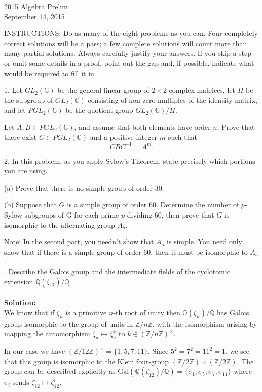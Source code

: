 \documentclass[11pt]{article}
\newcommand{\Z}{\mathbb{Z}}
\newcommand{\Q}{\mathbb{Q}}
\newcommand{\C}{\mathbb{C}}
\begin{document}
\begin{center}
\Large 2015 Algebra Prelim\\
\normalsize September 14, 2015
\end{center}
\vspace{1em}

INSTRUCTIONS: Do as many of the eight problems as you can. Four completely
correct solutions will be a pass; a few complete solutions will count more than many
partial solutions. Always carefully justify your answers. If you skip a step or omit
some details in a proof, point out the gap and, if possible, indicate what would be
required to fill it in\\
\vspace{1em}

1. Let $GL_2(\C)$ be the general linear group of $2\times 2$ complex matrices, let $H$ be the subgroup
of $GL_2(\C)$ consisting of non-zero multiples of the identity matrix, and let $PGL_2(\C)$ be
the quotient group $GL_2(\C)/ H$.

Let $A, B\in PGL_2(\C)$, and assume that both elements have order $n$. Prove that there
exist $C\in PGL_2(\C)$ and a positive integer $m$ such that\[
CBC^{-1} = A^m.\]

2. In this problem, as you apply Sylow’s Theorem, state precisely which portions you are
using.

(a) Prove that there is no simple group of order 30.

(b) Suppose that $G$ is a simple group of order $60$. Determine the number of $p$-Sylow
subgroups of G for each prime $p$ dividing 60, then prove that $G$ is isomorphic to
the alternating group $A_5$.

Note: In the second part, you needn’t show that $A_5$ is simple. You need only show
that if there is a simple group of order 60, then it must be isomorphic to $A_5$.\\
. Describe the Galois group and the intermediate fields of the cyclotomic extension
$\Q(\zeta_{12})/\Q$.\\\\
\textbf{Solution:}\\
We know that if $\zeta_n$ is a primitive $n$-th root of unity then $\Q(\zeta_n)/\Q$ has Galois group isomorphic to the group of units in $\Z/n\Z$, with the isomorphism arising by mapping the automorphism $\zeta_n\mapsto \zeta_n^k$ to $k\in (\Z/n\Z)^\times$. 

In our case we have $(\Z/12\Z)^\times = \{1,5,7,11\}$. Since $5^2 = 7^2 = 11^2 = 1$, we see that this group is isomorphic to the Klein four-group $(\Z/2\Z)\times (\Z/2\Z)$. The group can be described explicitly as $\mbox{Gal}(\Q(\zeta_{12})/\Q) = \{\sigma_1, \sigma_5, \sigma_7,\sigma_{11}\}$ where $\sigma_i$ sends $\zeta_{12}\mapsto \zeta_{12}^i$. 
\end{document}
